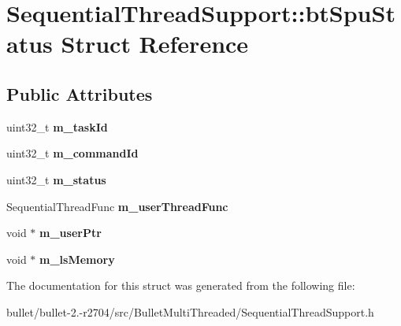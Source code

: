 \hypertarget{struct_sequential_thread_support_1_1bt_spu_status}{\section{Sequential\+Thread\+Support\+:\+:bt\+Spu\+Status Struct Reference}
\label{struct_sequential_thread_support_1_1bt_spu_status}
}
\subsection*{Public Attributes}
\begin{DoxyCompactItemize}
\item 
\hypertarget{struct_sequential_thread_support_1_1bt_spu_status_a2374b483ce4b456ef2e4bfbcdb70249a}{uint32\+\_\+t {\bfseries m\+\_\+task\+Id}}\label{struct_sequential_thread_support_1_1bt_spu_status_a2374b483ce4b456ef2e4bfbcdb70249a}

\item 
\hypertarget{struct_sequential_thread_support_1_1bt_spu_status_a4472953c6cfa475a511d458a582e18d8}{uint32\+\_\+t {\bfseries m\+\_\+command\+Id}}\label{struct_sequential_thread_support_1_1bt_spu_status_a4472953c6cfa475a511d458a582e18d8}

\item 
\hypertarget{struct_sequential_thread_support_1_1bt_spu_status_a9807e30211d64e90ea07cdfcc62985a0}{uint32\+\_\+t {\bfseries m\+\_\+status}}\label{struct_sequential_thread_support_1_1bt_spu_status_a9807e30211d64e90ea07cdfcc62985a0}

\item 
\hypertarget{struct_sequential_thread_support_1_1bt_spu_status_a9ccba5b7691f909a2ffea472a641145e}{Sequential\+Thread\+Func {\bfseries m\+\_\+user\+Thread\+Func}}\label{struct_sequential_thread_support_1_1bt_spu_status_a9ccba5b7691f909a2ffea472a641145e}

\item 
\hypertarget{struct_sequential_thread_support_1_1bt_spu_status_ab6d276f44e74fc90c98273ef367fa6bb}{void $\ast$ {\bfseries m\+\_\+user\+Ptr}}\label{struct_sequential_thread_support_1_1bt_spu_status_ab6d276f44e74fc90c98273ef367fa6bb}

\item 
\hypertarget{struct_sequential_thread_support_1_1bt_spu_status_a889712267800dca32f13f6707bbb0977}{void $\ast$ {\bfseries m\+\_\+ls\+Memory}}\label{struct_sequential_thread_support_1_1bt_spu_status_a889712267800dca32f13f6707bbb0977}

\end{DoxyCompactItemize}


The documentation for this struct was generated from the following file\+:\begin{DoxyCompactItemize}
\item 
bullet/bullet-\/2.-\/r2704/src/\+Bullet\+Multi\+Threaded/Sequential\+Thread\+Support.\+h\end{DoxyCompactItemize}
